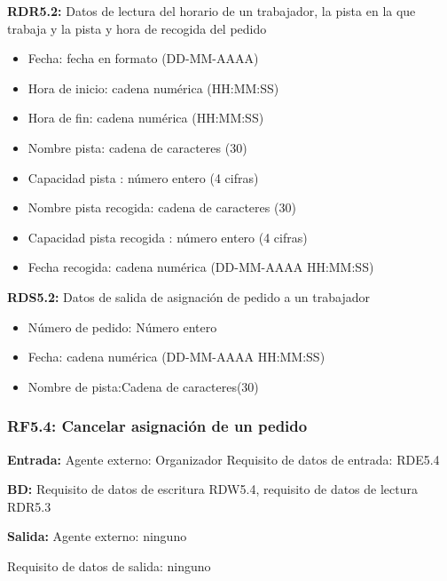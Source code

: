 \textbf{RDR5.2:} Datos de lectura del horario de un trabajador, la pista en la que trabaja y la pista y hora de recogida del pedido
\begin{itemize}
	\item Fecha: fecha en formato (DD-MM-AAAA)    
    \item Hora de inicio: cadena numérica (HH:MM:SS)
    \item Hora de fin: cadena numérica (HH:MM:SS)
\newline
	\item Nombre pista: cadena de caracteres (30)
	\item Capacidad pista : número entero (4 cifras)
	\item Nombre pista recogida: cadena de caracteres (30)
	\item Capacidad pista recogida : número entero (4 cifras)
	\item Fecha recogida: cadena numérica (DD-MM-AAAA HH:MM:SS)
\end{itemize}

\textbf{RDS5.2:} Datos de salida de asignación de pedido a un trabajador
\begin{itemize}
	\item Número de pedido: Número entero
	\item Fecha: cadena numérica (DD-MM-AAAA HH:MM:SS)
	\item Nombre de pista:Cadena de caracteres(30)
\end{itemize}

\subsubsection{RF5.4: Cancelar asignación de un pedido}

\textbf{Entrada:} Agente externo: Organizador        Requisito de datos de entrada: RDE5.4

\textbf{BD:} Requisito de datos de escritura RDW5.4, requisito de datos de lectura RDR5.3

\textbf{Salida:} Agente externo: ninguno

Requisito de datos de salida: ninguno

